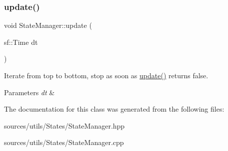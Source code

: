 \subsubsection{\texorpdfstring{update()}{update()}}
{\footnotesize\ttfamily void State\+Manager\+::update (\begin{DoxyParamCaption}\item[{sf\+::\+Time}]{dt }\end{DoxyParamCaption})}



Iterate from top to bottom, stop as soon as \hyperlink{classStateManager_a07b3a4d61e0f75fc6c8730f9f77449a4}{update()} returns false. 


\begin{DoxyParams}{Parameters}
{\em dt} & \\
\hline
\end{DoxyParams}


The documentation for this class was generated from the following files\+:\begin{DoxyCompactItemize}
\item 
sources/utils/\+States/State\+Manager.\+hpp\item 
sources/utils/\+States/State\+Manager.\+cpp\end{DoxyCompactItemize}
